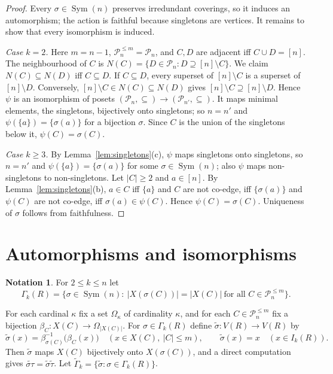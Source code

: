 \documentclass{amsart}
\theoremstyle{definition}
\newtheorem{notation}[theorem]{Notation}
\theoremstyle{remark}
\newcommand{\Sym}{\operatorname{Sym}}
\newcommand{\cP}{\mathcal{P}}
\newcommand{\nn}{[n]}
\begin{document}
\begin{proof}
Every $\sigma\in\Sym(n)$ preserves irredundant coverings, so it induces an automorphism; the action is faithful because singletons are vertices. It remains to show that every isomorphism is induced.

\emph{Case $k=2$.} Here $m=n-1$, $\cP_n^{\le m}=\cP_n$, and $C,D$ are adjacent iff $C\cup D=\nn$. The neighbourhood of $C$ is $N(C)=\{D\in\cP_n: D\supseteq\nn\setminus C\}$. We claim $N(C)\subseteq N(D)$ iff $C\subseteq D$. If $C\subseteq D$, every superset of $\nn\setminus C$ is a superset of $\nn\setminus D$. Conversely, $\nn\setminus C\in N(C)\subseteq N(D)$ gives $\nn\setminus C\supseteq\nn\setminus D$. Hence $\psi$ is an isomorphism of posets $(\cP_n,\subseteq)\to(\cP_{n'},\subseteq)$. It maps minimal elements, the singletons, bijectively onto singletons; so $n=n'$ and $\psi(\{a\})=\{\sigma(a)\}$ for a bijection $\sigma$. Since $C$ is the union of the singletons below it, $\psi(C)=\sigma(C)$.

\emph{Case $k\ge3$.} By Lemma~\ref{lem:singletons}(c), $\psi$ maps singletons onto singletons, so $n=n'$ and $\psi(\{a\})=\{\sigma(a)\}$ for some $\sigma\in\Sym(n)$; also $\psi$ maps non-singletons to non-singletons. Let $|C|\ge2$ and $a\in\nn$. By Lemma~\ref{lem:singletons}(b), $a\in C$ iff $\{a\}$ and $C$ are not co-edge, iff $\{\sigma(a)\}$ and $\psi(C)$ are not co-edge, iff $\sigma(a)\in\psi(C)$. Hence $\psi(C)=\sigma(C)$. Uniqueness of $\sigma$ follows from faithfulness.
\end{proof}

\section{Automorphisms and isomorphisms}\label{sec:main}

\begin{notation}
For $2\le k\le n$ let
\[
\Gamma_k(R)=\bigl\{\sigma\in\Sym(n):\ |X(\sigma(C))|=|X(C)|\ \text{for all } C\in\cP_n^{\le m}\bigr\}.
\]
\end{notation}

For each cardinal $\kappa$ fix a set $\Omega_\kappa$ of cardinality $\kappa$, and for each $C\in\cP_n^{\le m}$ fix a bijection $\beta_C\colon X(C)\to\Omega_{|X(C)|}$. For $\sigma\in\Gamma_k(R)$ define $\tilde\sigma\colon V(R)\to V(R)$ by
\[
\tilde\sigma(x)=\beta_{\sigma(C)}^{-1}\bigl(\beta_C(x)\bigr)\quad (x\in X(C),\ |C|\le m),\qquad \tilde\sigma(x)=x\quad(x\in I_k(R)).
\]
Then $\tilde\sigma$ maps $X(C)$ bijectively onto $X(\sigma(C))$, and a direct computation gives $\widetilde{\sigma\tau}=\tilde\sigma\tilde\tau$. Let $\tilde\Gamma_k=\{\tilde\sigma:\sigma\in\Gamma_k(R)\}$.
\end{document}
